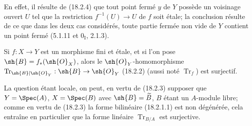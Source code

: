 En effet, il résulte de (18.2.4) que tout point fermé $y$ de $Y$ possède un voisinage ouvert $U$ tel que la restriction $f^{-1}(U)\to U$ de $f$ soit étale; la conclusion résulte de ce que dans les deux cas considérés, toute partie fermée non vide de $Y$ contient un point fermé (5.1.11 et $0_{\mathrm I}$, 2.1.3).

\begin{corollary}[18.2.6]
\label{IV.18.2.6}
Si $f:X\to Y$ est un morphisme fini et étale, et si l'on pose $\sh{B}=f_*(\sh{O}_X)$, alors le $\sh{O}_Y$-homomorphisme $\operatorname{Tr}_{\sh{B}|\sh{O}_Y}:\sh{B}\to\sh{O}_Y$ (18.2.2) (aussi noté $\operatorname{Tr}_f$) est surjectif.
\end{corollary}

La question étant locale, on peut, en vertu de (18.2.3) supposer que $Y=\Spec(A)$, $X=\Spec(B)$ avec $\sh{B}=\widetilde B$, $B$ étant un $A$-module libre; comme en vertu de (18.2.3) la forme bilinéaire (18.2.1.1) est non dégénérée, cela entraîne en particulier que la forme linéaire $\operatorname{Tr}_{B/A}$ est surjective.

